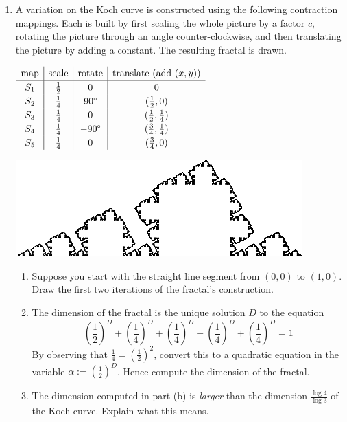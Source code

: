 \begin{exercises}
\begin{enumerate}
		\item A variation on the Koch curve is constructed using the following contraction mappings. Each is built by first scaling the whole picture by a factor $c$, rotating the picture through an angle counter-clockwise, and then translating the picture by adding a constant. The resulting fractal is drawn.\par  
	  \begin{minipage}{0.52\linewidth}
		  \qquad$\displaystyle\def\arraystretch{1.2}
		  \begin{array}{c|c|c|c}
			  \text{map}&\text{scale}&\text{rotate}&\text{translate (add $(x,y)$)}\\\hline
			  S_1&\frac 12&0&0\\
			  S_2&\frac 14&\ang{90}&(\frac 12,0)\\
			  S_3&\frac 14&0&(\frac 12,\frac 14)\\
			  S_4&\frac 14&-\ang{90}&(\frac 34,\frac 14)\\
			  S_5&\frac 14&0&(\frac 34,0)
		  \end{array}$
	  \end{minipage}
	  \hfill
	  \begin{minipage}{0.47\linewidth}
	  	\flushright\includegraphics{fractal}
	  \end{minipage}\par
	  \begin{enumerate}
	    \item Suppose you start with the straight line segment from $(0,0)$ to $(1,0)$. Draw the first two iterations of the fractal's construction.
	    \item The dimension of the fractal is the unique solution $D$ to the equation
	    \[
	    	\left(\frac 12\right)^D+\left(\frac 14\right)^D+\left(\frac 14\right)^D+\left(\frac 14\right)^D+\left(\frac 14\right)^D=1
	    \]
	    By observing that $\frac 14=\left(\frac 12\right)^2$, convert this to a quadratic equation in the variable $\alpha:=\left(\frac 12\right)^D$. Hence compute the dimension of the fractal.
	    \item The dimension computed in part (b) is \emph{larger} than the dimension $\frac{\log 4}{\log 3}$ of the Koch curve. Explain what this means.
	  \end{enumerate}
	

\end{enumerate}
\end{exercises}
